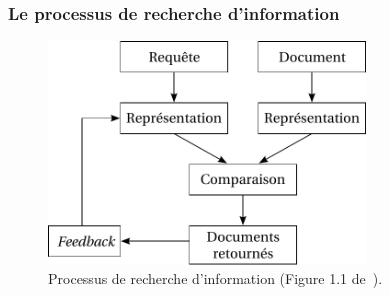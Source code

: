 \documentclass[12pt,aspectratio=43,dvipsnames,table]{beamer}
\begin{document}
\begin{frame}
    \frametitle{Le processus de recherche d'information}
    \begin{figure}
    \centering
    \includegraphics[width=0.75\textwidth]{img/typicalIR.pdf}
    \caption{Processus de recherche d'information (Figure 1.1 
             de~\cite{DBLP:series/synthesis/2010Nie}).}
    \end{figure}
\end{frame}
\end{document}
